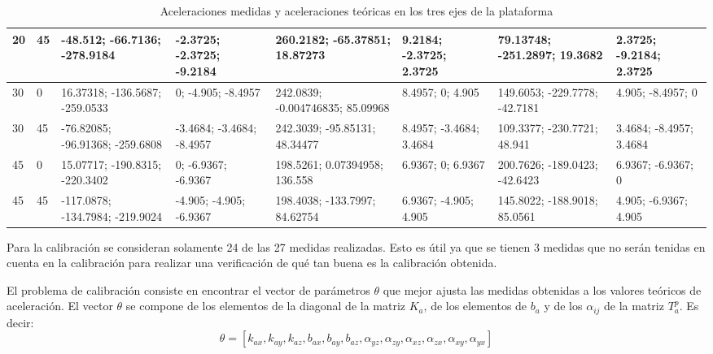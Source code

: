 \documentclass[main]{subfiles}
\begin{document}
\begin{table}[H]
\begin{tiny}
\begin{tabular}{p{30pt}p{30pt}|p{40pt}|p{26pt}|p{40pt}|p{26pt}|p{40pt}|p{26pt}|}
\multicolumn{1}{|p{30pt}|}{20} & 45 &   -48.512;     -66.7136;    -278.9184 & -2.3725;    -2.3725;    -9.2184 & 260.2182;       -65.37851;     18.87273 & 9.2184;    -2.3725;    2.3725 & 79.13748;    -251.2897;     19.3682 & 2.3725;    -9.2184;    2.3725\\ \hline
\multicolumn{1}{|p{30pt}|}{30} & 0  &  16.37318;    -136.5687;    -259.0533 &       0;     -4.905;    -8.4957 & 242.0839;    -0.004746835;     85.09968 & 8.4957;          0;     4.905 & 149.6053;    -229.7778;    -42.7181 &  4.905;    -8.4957;         0\\ \hline
\multicolumn{1}{|p{30pt}|}{30} & 45 & -76.82085;    -96.91368;    -259.6808 & -3.4684;    -3.4684;    -8.4957 & 242.3039;       -95.85131;     48.34477 & 8.4957;    -3.4684;    3.4684 & 109.3377;    -230.7721;      48.941 & 3.4684;    -8.4957;    3.4684\\ \hline
\multicolumn{1}{|p{30pt}|}{45} & 0  &  15.07717;    -190.8315;    -220.3402 &       0;    -6.9367;    -6.9367 & 198.5261;      0.07394958;      136.558 & 6.9367;          0;    6.9367 & 200.7626;    -189.0423;    -42.6423 & 6.9367;    -6.9367;         0\\ \hline
\multicolumn{1}{|p{30pt}|}{45} & 45 & -117.0878;    -134.7984;    -219.9024 &  -4.905;     -4.905;    -6.9367 & 198.4038;       -133.7997;     84.62754 & 6.9367;     -4.905;     4.905 & 145.8022;    -188.9018;     85.0561 &  4.905;    -6.9367;     4.905\\ \hline


\end{tabular}
\caption{Aceleraciones medidas y aceleraciones teóricas en los tres ejes de la plataforma}
\label{tab:acc}
\end{tiny}
\end{table} 

Para la calibración se consideran solamente 24 de las 27 medidas realizadas. Esto es útil ya que se tienen 3 medidas que no serán tenidas en cuenta en la calibración para realizar una verificación de qué tan buena es la calibración obtenida.

El problema de calibración consiste en encontrar el vector de parámetros $\theta$ que mejor ajusta las medidas obtenidas a los valores teóricos de aceleración. El vector $\theta$ se compone de los elementos de la diagonal de la matriz $K_a$, de los elementos de $b_a$ y de los $\alpha_{ij}$ de la matriz $T_a^p$. Es decir: $$\theta =\left[ k_{ax} , k_{ay} , k_{az} ,b_{ax} ,b_{ay} ,b_{az}, \alpha_{yz} , \alpha_{zy} , \alpha_{xz} , \alpha_{zx} , \alpha_{xy} , \alpha_{yx} \right]$$
\end{document}
